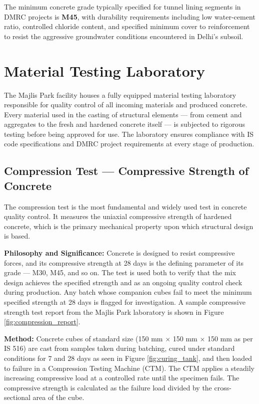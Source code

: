 \par\noindent
The minimum concrete grade typically specified for tunnel lining segments in DMRC projects is \textbf{M45}, with durability requirements including low water-cement ratio, controlled chloride content, and specified minimum cover to reinforcement to resist the aggressive groundwater conditions encountered in Delhi's subsoil.
\section{Material Testing Laboratory}
\par\noindent
The Majlis Park facility houses a fully equipped material testing laboratory responsible for quality control of all incoming materials and produced concrete. Every material used in the casting of structural elements --- from cement and aggregates to the fresh and hardened concrete itself --- is subjected to rigorous testing before being approved for use. The laboratory ensures compliance with IS code specifications and DMRC project requirements at every stage of production.

\subsection{Compression Test --- Compressive Strength of Concrete}
\par\noindent
The compression test is the most fundamental and widely used test in concrete quality control. It measures the uniaxial compressive strength of hardened concrete, which is the primary mechanical property upon which structural design is based.

\par\noindent
\textbf{Philosophy and Significance:} Concrete is designed to resist compressive forces, and its compressive strength at 28 days is the defining parameter of its grade --- M30, M45, and so on. The test is used both to verify that the mix design achieves the specified strength and as an ongoing quality control check during production. Any batch whose companion cubes fail to meet the minimum specified strength at 28 days is flagged for investigation. A sample compressive strength test report from the Majlis Park laboratory is shown in Figure \ref{fig:compression_report}.

\par\noindent
\textbf{Method:} Concrete cubes of standard size (150 mm $\times$ 150 mm $\times$ 150 mm as per IS 516) are cast from samples taken during batching, cured under standard conditions for 7 and 28 days as seen in Figure \ref{fig:curing_tank}, and then loaded to failure in a Compression Testing Machine (CTM). The CTM applies a steadily increasing compressive load at a controlled rate until the specimen fails. The compressive strength is calculated as the failure load divided by the cross-sectional area of the cube.


